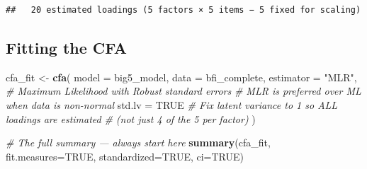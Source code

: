 \documentclass[
]{article}
\newenvironment{Shaded}{\begin{snugshade}}{\end{snugshade}}
\newcommand{\AttributeTok}[1]{\textcolor[rgb]{0.13,0.29,0.53}{#1}}
\newcommand{\CommentTok}[1]{\textcolor[rgb]{0.56,0.35,0.01}{\textit{#1}}}
\newcommand{\ConstantTok}[1]{\textcolor[rgb]{0.56,0.35,0.01}{#1}}
\newcommand{\FunctionTok}[1]{\textcolor[rgb]{0.13,0.29,0.53}{\textbf{#1}}}
\newcommand{\NormalTok}[1]{#1}
\newcommand{\OtherTok}[1]{\textcolor[rgb]{0.56,0.35,0.01}{#1}}
\newcommand{\StringTok}[1]{\textcolor[rgb]{0.31,0.60,0.02}{#1}}
\begin{document}
\begin{verbatim}
##   20 estimated loadings (5 factors × 5 items − 5 fixed for scaling)
\end{verbatim}

\subsection{Fitting the CFA}\label{fitting-the-cfa}

\begin{Shaded}
\begin{Highlighting}[]
\NormalTok{cfa\_fit }\OtherTok{\textless{}{-}} \FunctionTok{cfa}\NormalTok{(}
  \AttributeTok{model     =}\NormalTok{ big5\_model,}
  \AttributeTok{data      =}\NormalTok{ bfi\_complete,}
  \AttributeTok{estimator =} \StringTok{"MLR"}\NormalTok{,    }\CommentTok{\# Maximum Likelihood with Robust standard errors}
                        \CommentTok{\# MLR is preferred over ML when data is non{-}normal}
  \AttributeTok{std.lv    =} \ConstantTok{TRUE}      \CommentTok{\# Fix latent variance to 1 so ALL loadings are estimated}
                        \CommentTok{\# (not just 4 of the 5 per factor)}
\NormalTok{)}

\CommentTok{\# The full summary — always start here}
\FunctionTok{summary}\NormalTok{(cfa\_fit, }\AttributeTok{fit.measures=}\ConstantTok{TRUE}\NormalTok{, }\AttributeTok{standardized=}\ConstantTok{TRUE}\NormalTok{, }\AttributeTok{ci=}\ConstantTok{TRUE}\NormalTok{)}
\end{Highlighting}
\end{Shaded}
\end{document}
